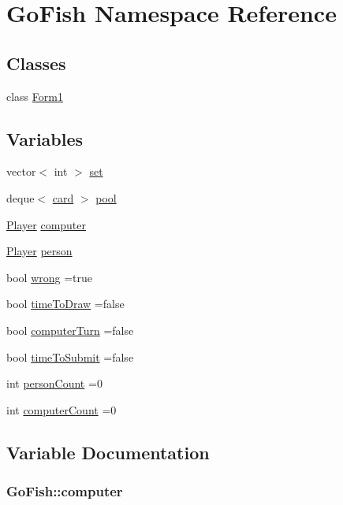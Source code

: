 \hypertarget{namespace_go_fish}{\section{Go\+Fish Namespace Reference}
\label{namespace_go_fish}
}
\subsection*{Classes}
\begin{DoxyCompactItemize}
\item 
class \hyperlink{class_go_fish_1_1_form1}{Form1}
\end{DoxyCompactItemize}
\subsection*{Variables}
\begin{DoxyCompactItemize}
\item 
vector$<$ int $>$ \hyperlink{namespace_go_fish_a0516ae63daeafe7d734fd0e380a5cd24}{set}
\item 
deque$<$ \hyperlink{classcard}{card} $>$ \hyperlink{namespace_go_fish_aac69982a27bedb89f2ec4a108be9e7c1}{pool}
\item 
\hyperlink{class_player}{Player} \hyperlink{namespace_go_fish_a9fdd5a69166f90eee7f9717e376ea9bb}{computer}
\item 
\hyperlink{class_player}{Player} \hyperlink{namespace_go_fish_ad4928743b77010f80388ae5f5495bb1b}{person}
\item 
bool \hyperlink{namespace_go_fish_a5ef343351958e4a4c45cfa2d0aa895b5}{wrong} =true
\item 
bool \hyperlink{namespace_go_fish_a76b216755d7556d9ee96ca7ae0fa620d}{time\+To\+Draw} =false
\item 
bool \hyperlink{namespace_go_fish_a1e5e3f29ab64f86a067ee143e1ca2996}{computer\+Turn} =false
\item 
bool \hyperlink{namespace_go_fish_af285f106abe3d068160690d582c4ec70}{time\+To\+Submit} =false
\item 
int \hyperlink{namespace_go_fish_a678c54ee6f4ee2d5eb6ddc8922c1f38d}{person\+Count} =0
\item 
int \hyperlink{namespace_go_fish_a9e05ca6eb20a4dbd5eedd1ed0540de91}{computer\+Count} =0
\end{DoxyCompactItemize}


\subsection{Variable Documentation}
\hypertarget{namespace_go_fish_a9fdd5a69166f90eee7f9717e376ea9bb}{
\subsubsection[{computer}]{ Go\+Fish\+::computer}}\label{namespace_go_fish_a9fdd5a69166f90eee7f9717e376ea9bb}


